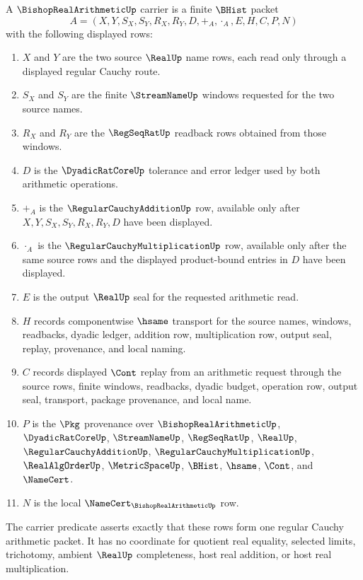 \begin{definition}
\label{def:bishop-real-arithmetic-carrier}
A $\BishopRealArithmeticUp$ carrier is a finite $\BHist$ packet
$$
A=(X,Y,S_X,S_Y,R_X,R_Y,D,+_A,\cdot_A,E,H,C,P,N)
$$
with the following displayed rows:
\begin{enumerate}
\item $X$ and $Y$ are the two source $\RealUp$ name rows, each read only through a displayed regular Cauchy route.
\item $S_X$ and $S_Y$ are the finite $\StreamNameUp$ windows requested for the two source names.
\item $R_X$ and $R_Y$ are the $\RegSeqRatUp$ readback rows obtained from those windows.
\item $D$ is the $\DyadicRatCoreUp$ tolerance and error ledger used by both arithmetic operations.
\item $+_A$ is the $\RegularCauchyAdditionUp$ row, available only after $X,Y,S_X,S_Y,R_X,R_Y,D$ have been displayed.
\item $\cdot_A$ is the $\RegularCauchyMultiplicationUp$ row, available only after the same source rows and the displayed product-bound entries in $D$ have been displayed.
\item $E$ is the output $\RealUp$ seal for the requested arithmetic read.
\item $H$ records componentwise $\hsame$ transport for the source names, windows, readbacks, dyadic ledger, addition row, multiplication row, output seal, replay, provenance, and local naming.
\item $C$ records displayed $\Cont$ replay from an arithmetic request through the source rows, finite windows, readbacks, dyadic budget, operation row, output seal, transport, package provenance, and local name.
\item $P$ is the $\Pkg$ provenance over $\BishopRealArithmeticUp$, $\DyadicRatCoreUp$, $\StreamNameUp$, $\RegSeqRatUp$, $\RealUp$, $\RegularCauchyAdditionUp$, $\RegularCauchyMultiplicationUp$, $\RealAlgOrderUp$, $\MetricSpaceUp$, $\BHist$, $\hsame$, $\Cont$, and $\NameCert$.
\item $N$ is the local $\NameCert_{\BishopRealArithmeticUp}$ row.
\end{enumerate}
The carrier predicate asserts exactly that these rows form one regular Cauchy arithmetic packet. It has no coordinate for quotient real equality, selected limits, trichotomy, ambient $\RealUp$ completeness, host real addition, or host real multiplication.
\end{definition}


